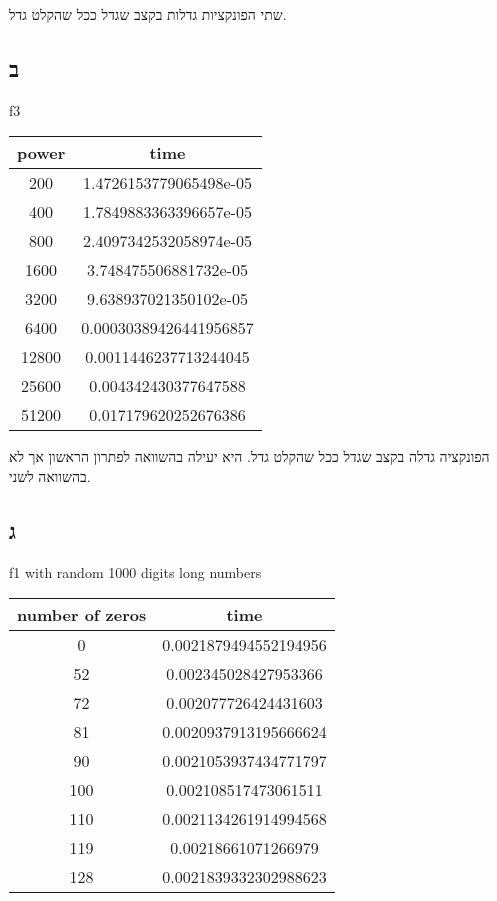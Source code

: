 \documentclass[12pt]{report}
\begin{document}
שתי הפונקציות גדלות בקצב שגדל ככל שהקלט גדל.
\subsection*{ב}
f3
\begin{tabular}{| c | c |}
\hline
power & time \\
\hline
200 & 1.4726153779065498e-05 \\
\hline
400 & 1.7849883363396657e-05 \\
\hline
800 & 2.4097342532058974e-05 \\
\hline
1600 & 3.748475506881732e-05 \\
\hline
3200 & 9.638937021350102e-05 \\
\hline
6400 & 0.00030389426441956857 \\
\hline
12800 & 0.0011446237713244045 \\
\hline
25600 & 0.004342430377647588 \\
\hline
51200 & 0.017179620252676386 \\
\hline
\end{tabular}

הפונקציה גדלה בקצב שגדל ככל שהקלט גדל.
היא יעילה בהשוואה לפתרון הראשון אך לא בהשוואה לשני.
\subsection*{ג}
f1 with random 1000 digits long numbers
\begin{tabular}{| c | c |}
\hline
number of zeros & time \\
\hline
0 & 0.0021879494552194956 \\
\hline
52 & 0.002345028427953366 \\
\hline
72 & 0.002077726424431603 \\
\hline
81 & 0.0020937913195666624 \\
\hline
90 & 0.0021053937434771797 \\
\hline
100 & 0.002108517473061511 \\
\hline
110 & 0.0021134261914994568 \\
\hline
119 & 0.00218661071266979 \\
\hline
128 & 0.0021839332302988623 \\
\hline
\end{tabular}
\\ 
\end{document}

